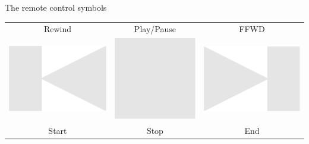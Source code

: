 \documentclass[14pt]{beamer}
\begin{document}
\begin{frame}{The remote control symbols}
\begin{center}
\begin{tabular}{ccc}
                 Rewind \quad&\quad Play/Pause \quad&\quad FFWD \\[2.5ex]
                      \includegraphics[scale=0.2]{figures/figure026o.pdf} \quad&
                 \quad\includegraphics[scale=0.2]{figures/figure026m.pdf} \quad&
                 \quad\includegraphics[scale=0.2]{figures/figure026n.pdf} \\
                 Start \quad&\quad Stop \quad&\quad End \\[1.5ex]

\end{tabular}
\end{center}
\end{frame}
\end{document}
